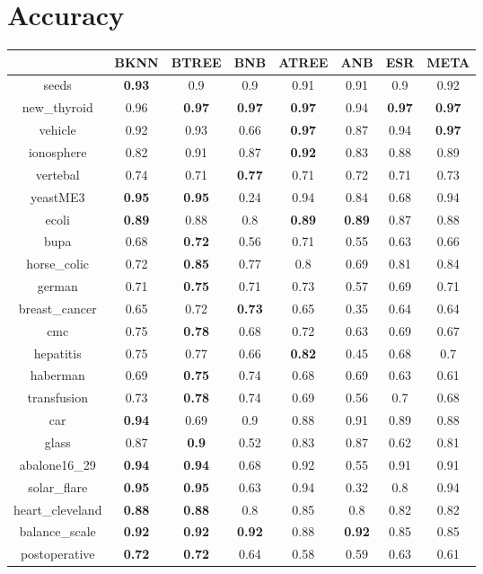 \documentclass{article}%
\begin{document}
%
\normalsize%
\section*{Accuracy}%
\begin{tabular}{c|ccccccc}%
\hline%
&BKNN&BTREE&BNB&ATREE&ANB&ESR&META\\%
\hline%
seeds&\textbf{0.93}&0.9&0.9&0.91&0.91&0.9&0.92\\%
new\_thyroid&0.96&\textbf{0.97}&\textbf{0.97}&\textbf{0.97}&0.94&\textbf{0.97}&\textbf{0.97}\\%
vehicle&0.92&0.93&0.66&\textbf{0.97}&0.87&0.94&\textbf{0.97}\\%
ionosphere&0.82&0.91&0.87&\textbf{0.92}&0.83&0.88&0.89\\%
vertebal&0.74&0.71&\textbf{0.77}&0.71&0.72&0.71&0.73\\%
yeastME3&\textbf{0.95}&\textbf{0.95}&0.24&0.94&0.84&0.68&0.94\\%
ecoli&\textbf{0.89}&0.88&0.8&\textbf{0.89}&\textbf{0.89}&0.87&0.88\\%
bupa&0.68&\textbf{0.72}&0.56&0.71&0.55&0.63&0.66\\%
horse\_colic&0.72&\textbf{0.85}&0.77&0.8&0.69&0.81&0.84\\%
german&0.71&\textbf{0.75}&0.71&0.73&0.57&0.69&0.71\\%
breast\_cancer&0.65&0.72&\textbf{0.73}&0.65&0.35&0.64&0.64\\%
cmc&0.75&\textbf{0.78}&0.68&0.72&0.63&0.69&0.67\\%
hepatitis&0.75&0.77&0.66&\textbf{0.82}&0.45&0.68&0.7\\%
haberman&0.69&\textbf{0.75}&0.74&0.68&0.69&0.63&0.61\\%
transfusion&0.73&\textbf{0.78}&0.74&0.69&0.56&0.7&0.68\\%
car&\textbf{0.94}&0.69&0.9&0.88&0.91&0.89&0.88\\%
glass&0.87&\textbf{0.9}&0.52&0.83&0.87&0.62&0.81\\%
abalone16\_29&\textbf{0.94}&\textbf{0.94}&0.68&0.92&0.55&0.91&0.91\\%
solar\_flare&\textbf{0.95}&\textbf{0.95}&0.63&0.94&0.32&0.8&0.94\\%
heart\_cleveland&\textbf{0.88}&\textbf{0.88}&0.8&0.85&0.8&0.82&0.82\\%
balance\_scale&\textbf{0.92}&\textbf{0.92}&\textbf{0.92}&0.88&\textbf{0.92}&0.85&0.85\\%
postoperative&\textbf{0.72}&\textbf{0.72}&0.64&0.58&0.59&0.63&0.61\\%
\end{tabular}
\end{document}

